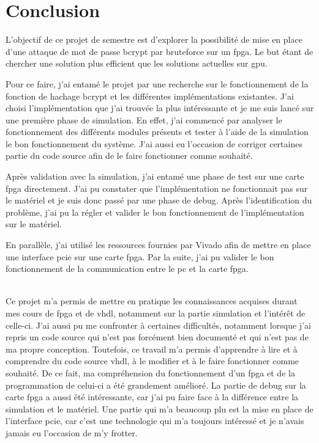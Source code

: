 \chapter*{Conclusion}


L'objectif de ce projet de semestre est d'explorer la possibilité de mise en place d'une attaque de mot de passe bcrypt par bruteforce sur un \gls{fpga}.
Le but étant de chercher une solution plus efficient que les solutions actuelles sur \gls{gpu}. 

Pour ce faire, j'ai entamé le projet par une recherche sur le fonctionnement de la fonction de hachage bcrypt et les différentes implémentations existantes.
J'ai choisi l'implémentation que j'ai trouvée la plus intéressante et je me suis lancé sur une première phase de simulation.
En effet, j'ai commencé par analyser le fonctionnement des différents modules présents et tester à l'aide de la simulation le bon fonctionnement du système.
J'ai aussi eu l'occasion de corriger certaines partie du code source afin de le faire fonctionner comme souhaité. 

Après validation avec la simulation, j'ai entamé une phase de test sur une carte \gls{fpga} directement. 
J'ai pu constater que l'implémentation ne fonctionnait pas sur le matériel et je suis donc passé par une phase de debug.
Après l'identification du problème, j'ai pu la régler et valider le bon fonctionnement de l'implémentation sur le matériel.

En parallèle, j'ai utilisé les ressources fournies par Vivado afin de mettre en place une interface \gls{pcie} sur une carte \gls{fpga}.
Par la suite, j'ai pu valider le bon fonctionnement de la communication entre le \gls{pc} et la carte \gls{fpga}.\\\


Ce projet m'a permis de mettre en pratique les connaissances acquises durant mes cours de \gls{fpga} et de \gls{vhdl}, notamment sur la partie simulation et l'intérêt de celle-ci.
J'ai aussi pu me confronter à certaines difficultés, notamment lorsque j'ai repris un code source qui n'est pas forcément bien documenté et qui n'est pas de ma propre conception.
Toutefois, ce travail m'a permis d'apprendre à lire et à comprendre du code source \gls{vhdl}, à le modifier et à le faire fonctionner comme souhaité.
De ce fait, ma compréhension du fonctionnement d'un \gls{fpga} et de la programmation de celui-ci a été grandement amélioré.
La partie de debug sur la carte \gls{fpga} a aussi été intéressante, car j'ai pu faire face à la différence entre la simulation et le matériel.
Une partie qui m'a beaucoup plu est la mise en place de l'interface \gls{pcie}, car c'est une technologie qui m'a toujours intéressé et je n'avais jamais eu l'occasion de m'y frotter.

